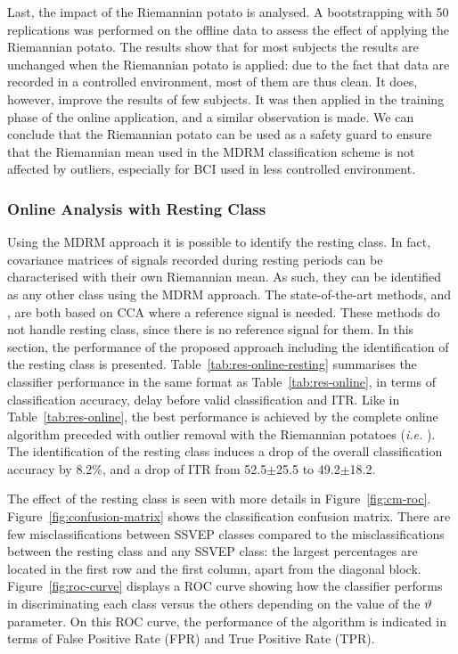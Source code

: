 Last, the impact of the Riemannian potato is analysed. 
A bootstrapping with 50 replications was performed on the offline data to assess the effect of applying the Riemannian potato. 
The results show that for most subjects the results are unchanged when the Riemannian potato is applied: due to the fact that data are recorded in a controlled environment, most of them are thus clean.
It does, however, improve the results of few subjects. 
It was then applied in the training phase of the online application, and a similar observation is made. 
We can conclude that the Riemannian potato can be used as a safety guard to ensure that the Riemannian mean used in the MDRM classification scheme is not affected by outliers, especially for BCI used in less controlled environment.

\subsubsection{Online Analysis with Resting Class}

Using the MDRM approach it is possible to identify the resting class. 
In fact, covariance matrices of signals recorded during resting periods can be characterised with their own Riemannian mean.
As such, they can be identified as any other class using the MDRM approach.
The state-of-the-art methods, \citep{lin_frequency_2006} and \citep{nakanishi_high-speed_2014}, are both based on CCA where a reference signal is needed.
These methods do not handle resting class, since there is no reference signal for them.
In this section, the performance of the proposed approach including the identification of the resting class is presented.
Table~\ref{tab:res-online-resting} summarises the classifier performance in the same format as Table~\ref{tab:res-online}, in terms of classification accuracy, delay before valid classification and ITR.
Like in Table~\ref{tab:res-online}, the best performance is achieved  by the complete online algorithm preceded with outlier removal with the Riemannian potatoes (\textit{i.e.} \emph{\onlinepotato}).
The identification of the resting class induces a drop of the overall classification accuracy by 8.2\%, and a drop of ITR from 52.5$\pm$25.5 to 49.2$\pm$18.2.

The effect of the resting class is seen with more details in Figure~\ref{fig:cm-roc}. 
Figure~\ref{fig:confusion-matrix} shows the classification confusion matrix. 
There are few misclassifications between SSVEP classes compared to the misclassifications between the resting class and any SSVEP class: the largest percentages are located in the first row and the first column, apart from the diagonal block. 
Figure~\ref{fig:roc-curve} displays a ROC curve showing how the classifier performs in discriminating each class versus the others depending on the value of the $\vartheta$ parameter. 
On this ROC curve, the performance of the \onlinepotato{} algorithm is indicated in terms of False Positive Rate (FPR) and True Positive Rate (TPR).

